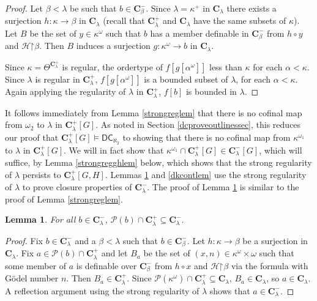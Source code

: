 \documentclass[12pt]{article}
\newtheorem{lemma}[theorem]{Lemma}
\def\bbC{{\mathbf{C}}}
\def\cH{{\mathcal{H}}}
\renewcommand{\models}{\vDash}
\newcommand{\powerset}{\mathcal{P}}
\newcommand{\DC}{\mathsf{DC}}
\newcommand{\cP}{\mathcal{P}}
\newcommand{\restrict}{\mathord{\upharpoonright}}
\begin{document}
\begin{proof} Let $\beta<\lambda$ be such that $b\in \bbC^{-}_{\beta}$.
Since
$\lambda = \kappa^{+}$ in $\bbC_{\lambda}$ there exists a surjection $h\colon \kappa\to \beta$ in $\bbC_{\lambda}$ (recall that $\bbC^{+}_{\lambda}$ and $\bbC_{\lambda}$ have the same subsets of $\kappa$).
Let $B$ be the set of $y \in \kappa^\omega$ such that $b$ has a member definable in $\bbC^{-}_{\beta}$ from
$h \circ y$ and $\cH \restrict \beta$.
Then $B$ induces a surjection $g \colon \kappa^{\omega} \to b$ in $\bbC_{\lambda}$.

Since $\kappa = \Theta^{\bbC^{+}_{\lambda}}$ is regular, the ordertype of $f[g[\alpha^{\omega}]]$ less than $\kappa$ for each $\alpha < \kappa$.
Since $\lambda$ is regular in $\bbC^{+}_{\lambda}$, $f[g[\alpha^{\omega}]]$ is a bounded subset of $\lambda$, for each $\alpha < \kappa$.
Again applying the regularity of $\lambda$ in $\bbC^{+}_{\lambda}$, $f[b]$ is bounded in $\lambda$.

\end{proof}

It follows immediately from Lemma \ref{strongreglem} that there is no cofinal map from $\omega_{2}$ to $\lambda$ in $\bbC^{+}_{\lambda}[G]$.
As noted in Section \ref{dcproveoutlinessec}, this reduces our proof that $\bbC^{+}_{\lambda}[G] \models \DC_{\aleph_{2}}$ to showing that there is no
cofinal map from $\kappa^{\omega_{1}}$ to $\lambda$ in $\bbC^{+}_{\lambda}[G]$. We will in fact show that $\kappa^{\omega_{1}} \cap \bbC^{+}_{\lambda}[G] \in \bbC^{-}_{\lambda}[G]$, which will suffice, by Lemma \ref{strongregghlem} below, which shows that the strong regularity of $\lambda$ persists to $\bbC^{+}_{\lambda}[G, H]$.
Lemmas \ref{cmpscllem} and \ref{dkcontlem} use the strong regularity of $\lambda$ to prove closure properties of $\bbC^{-}_{\lambda}$.
The proof of Lemma \ref{cmpscllem} is similar to the proof of Lemma \ref{strongreglem}.

\begin{lemma}\label{cmpscllem}
For all $b\in \bbC^-_{\lambda}$, $\cP(b) \cap \bbC^{+}_{\lambda} \subseteq \bbC^{-}_{\lambda}$.
\end{lemma}



\begin{proof}
Fix $b \in \bbC^{-}_{\lambda}$ and a $\beta<\lambda$ such that
$b\in \bbC^{-}_{\beta}$. Let
$h \colon \kappa \to \beta $ be a surjection in $\bbC_{\lambda}$.
Fix $a\in \powerset(b)\cap \bbC^+_{\lambda}$  and let $B_{a}$ be the set of $(x,n) \in \kappa^\omega \times \omega$ such that some member of $a$ is definable over $\bbC^{-}_{\beta}$ from $h \circ x$ and $\cH \restrict \beta$ via the formula with G\"{o}del number $n$.
Then $B_{a} \in \bbC^{+}_{\lambda}$. Since $\cP(\kappa^{\omega}) \cap \bbC^{+}_{\lambda} \subseteq \bbC_{\lambda}$, $B_{a}\in \bbC_{\lambda}$, so $a\in \bbC_{\lambda}$. A reflection argument using the strong regularity of $\lambda$ shows that $a \in \bbC^{-}_{\lambda}$.
\end{proof}
\end{document}
